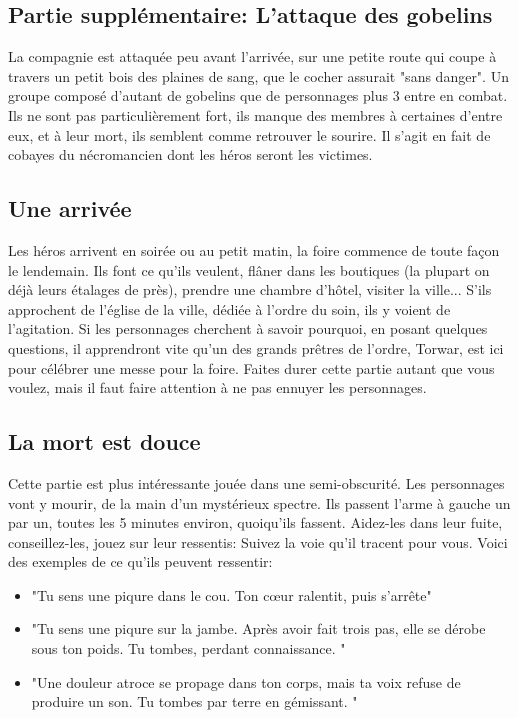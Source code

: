 \documentclass[a4paper, 11pt]{article}
\begin{document}
\subsection{Partie supplémentaire: L'attaque des gobelins} 
La compagnie est attaquée peu avant l'arrivée, sur une petite route qui coupe à travers un petit bois des plaines de sang, que le cocher assurait "sans danger". Un groupe composé d'autant de gobelins que de personnages plus 3 entre en combat. Ils ne sont pas particulièrement fort, ils manque des membres à certaines d'entre eux, et à leur mort, ils semblent comme retrouver le sourire. Il s'agit en fait de cobayes du nécromancien dont les héros seront les victimes. 

\subsection{Une arrivée}
Les héros arrivent en soirée ou au petit matin, la foire commence de toute façon le lendemain. Ils font ce qu'ils veulent, flâner dans les boutiques (la plupart on déjà leurs étalages de près), prendre une chambre d'hôtel, visiter la ville... S'ils approchent de l'église de la ville, dédiée à l'ordre du soin, ils y voient de l'agitation. Si les personnages cherchent à savoir pourquoi, en posant quelques questions, il apprendront vite qu'un des grands prêtres de l'ordre, Torwar, est ici pour célébrer une messe pour la foire. Faites durer cette partie autant que vous voulez, mais il faut faire attention à ne pas ennuyer les personnages.

\subsection{La mort est douce}
Cette partie est plus intéressante jouée dans une semi-obscurité. Les personnages vont y mourir, de la main d'un mystérieux spectre. Ils passent l'arme à gauche un par un, toutes les 5 minutes environ, quoiqu'ils fassent. Aidez-les dans leur fuite, conseillez-les, jouez sur leur ressentis: Suivez la voie qu'il tracent pour vous. Voici des exemples de ce qu'ils peuvent ressentir:
\begin{itemize}
\item "Tu sens une piqure dans le cou. Ton cœur ralentit, puis s’arrête"
\item  "Tu sens une piqure sur la jambe. Après avoir fait trois pas, elle se dérobe sous ton poids. Tu tombes, perdant connaissance. "
\item  "Une douleur atroce se propage dans ton corps, mais ta voix refuse de produire un son. Tu tombes par terre en gémissant. "
\end{itemize}
\end{document}
